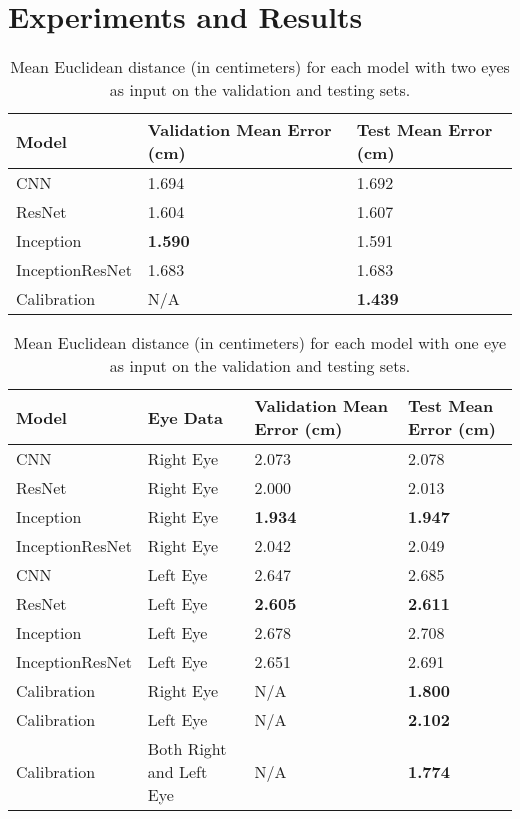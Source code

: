 \documentclass{article}
\begin{document}
\section{Experiments and Results}
\begin{table}
  \caption{Mean Euclidean distance (in centimeters) for each model with two eyes as input on the validation and testing sets.}
  \centering
  \begin{tabular}{lll}
    \toprule
    Model     & Validation Mean Error (cm)     & Test Mean Error (cm) \\
    \midrule
    CNN & 1.694  & 1.692     \\
    ResNet     & 1.604 & 1.607      \\
    Inception     & 
    \textbf{1.590}       & 1.591  \\
    InceptionResNet     & 1.683       & 1.683  \\
    Calibration & N/A & \textbf{1.439} \\
    \bottomrule
  \end{tabular}
  \label{table:table1}
\end{table}

\begin{table}
  \caption{Mean Euclidean distance (in centimeters) for each model with one eye as input on the validation and testing sets.}
  \centering
  \begin{tabular}{llll}
    \toprule
    Model     & Eye Data     & Validation Mean Error (cm)   & Test Mean Error (cm) \\
    \midrule
    CNN & Right Eye & 2.073 & 2.078 \\
    ResNet & Right Eye & 2.000 & 2.013 \\
    Inception & Right Eye & \textbf{1.934} & \textbf{1.947} \\
    InceptionResNet & Right Eye & 2.042 & 2.049 \\
    \midrule
    CNN & Left Eye & 2.647 & 2.685 \\
    ResNet & Left Eye & \textbf{2.605} & \textbf{2.611} \\
    Inception & Left Eye & 2.678 & 2.708 \\
    InceptionResNet & Left Eye & 2.651 & 2.691 \\
    \midrule
    Calibration & Right Eye & N/A & \textbf{1.800} \\
    Calibration & Left Eye & N/A & \textbf{2.102} \\
    Calibration & Both Right and Left Eye & N/A & \textbf{1.774} \\
    
    \bottomrule
  \end{tabular}
  \label{table:table2}
\end{table}
\end{document}
